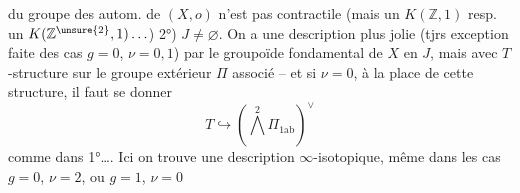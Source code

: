  du groupe des autom. de $(X,o)$
n'est pas contractile (mais un
$K(\mathbb Z,1)$ resp. un $K(\mathbb Z^{\unsure{2}},1)\ldots$)
2°) $J\ne\varnothing$. On a une description
plus jolie (tjrs exception faite
des cas $g=0$, $\nu=0,1$) par le
groupoïde fondamental de $X$
en $J$, mais avec $T$-structure
 sur le groupe extérieur
$\Pi$ associé -- et si $\nu=0$, à la place de
cette structure, il faut se donner
\[T\hookrightarrow(\bigwedge^2\Pi_{1\mathrm{ab}})^\vee\]
comme dans 1°\ldots. Ici on trouve
une description $\infty$-isotopique, même
dans les cas $g=0$, $\nu=2$, ou $g=1$, $\nu=0$

